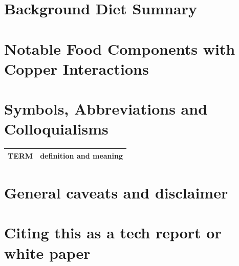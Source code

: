 \begin{mdpicomment}
\section{Background Diet Sumnary}




\section{Notable Food Components with Copper Interactions}

\label{appendix:interactions}
\mjmhuntcu

\section{Symbols, Abbreviations and Colloquialisms}

\noindent
\begin{tabular}{@{}ll}
TERM & definition and meaning   \\
\hline
\end{tabular} %


\section{General caveats and disclaimer }
\label{appendix:caveats}

%



\section{Citing this as a tech report or white paper }
\label{appendix:citing}


\end{mdpicomment}

